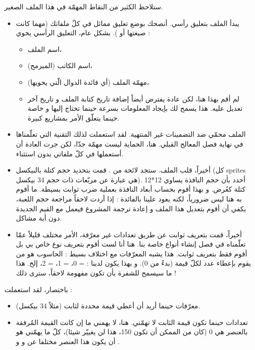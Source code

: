 ستلاحظ الكثير من النقاط المهمّة في هذا الملف الصغير.

\begin{itemize}
	\item يبدأ الملف بتعليق رأسي. أنصحك بوضع تعليق مماثل في كلّ ملفاتك (مهما كانت صيغتها
	أو
	).
	بشكل عام، التعليق الرأسي يحوي :
	\begin{itemize}
		\item اسم الملف،
		\item اسم الكاتب (المبرمج)،
		\item مهمّة الملف (أي فائدة الدوال الّتي يحويها)،
		\item لم أقم بهذا هنا، لكن عادة يفترض أيضاً إضافة تاريخ كتابة الملف و تاريخ آخر تعديل عليه. هذا يسمح لك بإيجاد المعلومات بسرعة حينما تحتاج إليها و خاصة حينما يتعلّق الأمر بمشاريع كبيرة.
	\end{itemize}
	\item الملف محمّي ضد التضمينات غير المنتهية. لقد استعملت لذلك التقنية التي تعلّمناها في نهاية فصل المعالج القبلي. هنا، الحماية ليست مهمّة جدّا، لكن جرت العادة أن أستعملها في كلّ ملفاتي
	بدون استثناء.
	\item أخيراً، قلب الملف. ستجد لائحة من 
	.
	قمت بتحديد حجم كتلة بالبيكسل (كل
	\textenglish{sprites}
	هي عبارة عن مربّعات ذات حجم 34 بيكسل). أحدد بأن حجم النافذة يساوي 12*12 كتلة كعُرض. و بهذا أقوم بحساب أبعاد النافذة بعملية ضرب ثوابت بسيطة. ما أقوم به هنا ليس ضرورياً، لكنه يعود علينا بالفائدة : إذا أردت لاحقاً مراجعة حجم اللعبة، يكفي أن أقوم بتعديل هذا الملف و إعادة ترجمة المشروع فيعمل مع القيم الجديدة دون أية مشاكل.
	\item أخيراً، قمت بتعريف ثوابت عن طريق تعدادات غير معرّفة، الأمر مختلف قليلاً عمّا تعلّمناه في فصل إنشاء أنواع خاصة بنا. هنا أنا لست أقوم بتعريف نوع خاص بي بل أقوم فقط بتعريف ثوابت. هذا يشبه المعرّفات مع اختلاف بسيط : الحاسوب هو من يقوم بإعطاء عدد لكلّ قيمة (بدءً من 0). و بهذا يكون لدينا : 
	 = 0،
	 = 1،
	 = 2،
	إلخ. هذا ما سيسمح للشفرة بأن تكون مفهومة لاحقاً، سترى ذلك !
\end{itemize}

باختصار، لقد استعملت :

\begin{itemize}
	\item معرّفات حينما أريد أن أعطي قيمة محددة لثابت (مثلاً 34 بيكسل).
	\item تعدادات حينما تكون قيمة الثابت لا تهمّني. هنا، لا يهمني ما إن كانت القيمة المُرفقة بالعنصر
	هي 0 (كان من الممكن أن تكون 150، هذا لن يغييّر شيئا)، كلّ ما يهمّني هو أن يكون هذا العنصر مختلفا عن
	و
	و
	.
\end{itemize}

